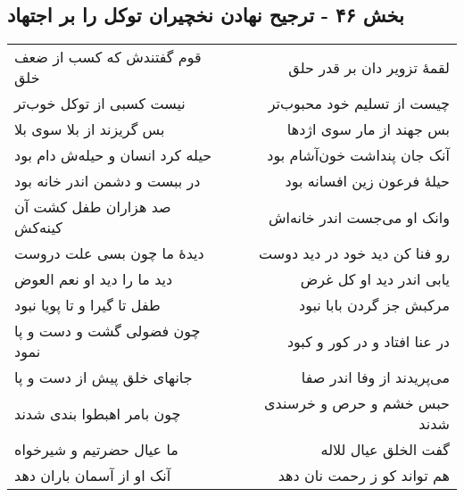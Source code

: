 \begin{center}
\section*{بخش ۴۶ - ترجیح نهادن نخچیران توکل را بر اجتهاد}
\label{sec:sh046}
\begin{longtable}{l p{0.5cm} r}
قوم گفتندش که کسب از ضعف خلق
&&
لقمهٔ تزویر دان بر قدر حلق
\\
نیست کسبی از توکل خوب‌تر
&&
چیست از تسلیم خود محبوب‌تر
\\
بس گریزند از بلا سوی بلا
&&
بس جهند از مار سوی اژدها
\\
حیله کرد انسان و حیله‌ش دام بود
&&
آنک جان پنداشت خون‌آشام بود
\\
در ببست و دشمن اندر خانه بود
&&
حیلهٔ فرعون زین افسانه بود
\\
صد هزاران طفل کشت آن کینه‌کش
&&
وانک او می‌جست اندر خانه‌اش
\\
دیدهٔ ما چون بسی علت دروست
&&
رو فنا کن دید خود در دید دوست
\\
دید ما را دید او نعم العوض
&&
یابی اندر دید او کل غرض
\\
طفل تا گیرا و تا پویا نبود
&&
مرکبش جز گردن بابا نبود
\\
چون فضولی گشت و دست و پا نمود
&&
در عنا افتاد و در کور و کبود
\\
جانهای خلق پیش از دست و پا
&&
می‌پریدند از وفا اندر صفا
\\
چون بامر اهبطوا بندی شدند
&&
حبس خشم و حرص و خرسندی شدند
\\
ما عیال حضرتیم و شیرخواه
&&
گفت الخلق عیال للاله
\\
آنک او از آسمان باران دهد
&&
هم تواند کو ز رحمت نان دهد
\\
\end{longtable}
\end{center}
